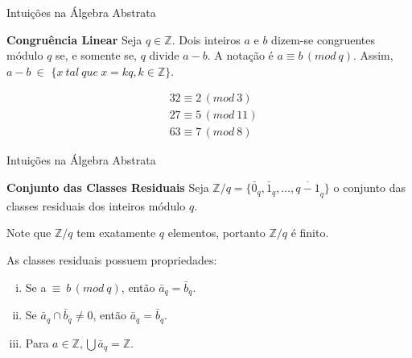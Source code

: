 \begin{frame}{Intuições na Álgebra Abstrata}
\begin{definition} {\bf Congruência Linear}  Seja $q \in \mathbb{Z}$. Dois inteiros $a$
 e $b$ dizem-se congruentes módulo $q$ se, e somente se, $q$ divide $a - b$. A notação é $a \equiv b\,(mod\ q)$. Assim, $a - b\ \in$ $\{x\ tal\ que\ x =  kq, k \in \mathbb{Z}\}$.
\end{definition}

\begin{example}
\begin{align*} %
& 32 \equiv 2\,(mod\ 3)\\
& 27 \equiv 5\,(mod\ 11)\\
& 63 \equiv 7\,(mod\ 8)
\end{align*}
\end{example}
  \end{frame}

\begin{frame}{Intuições na Álgebra Abstrata}
\begin{definition} {\bf Conjunto das Classes Residuais}  Seja $\mathbb{Z}/q = \{\bar{0}_q, \bar{1}_q, \ldots , \overline{q-1}_q\}$ o conjunto das classes residuais dos inteiros módulo $q$. 
\end{definition}

Note que $\mathbb{Z}/q$ tem exatamente $q$ elementos, portanto $\mathbb{Z}/q$ é finito.

As classes residuais possuem propriedades:
  \begin{enumerate}[(i)]
      \item Se a$\ \equiv\ b\,(mod\ q)$, então $\bar{a}_q = \bar{b}_q$.
      \item Se $\bar{a}_q \cap \bar{b}_q  \neq 0$, então $\bar{a}_q = \bar{b}_q$.
      \item Para $a \in \mathbb{Z}, \bigcup \bar{a}_q = \mathbb{Z}$.
  \end{enumerate}

  \end{frame}

